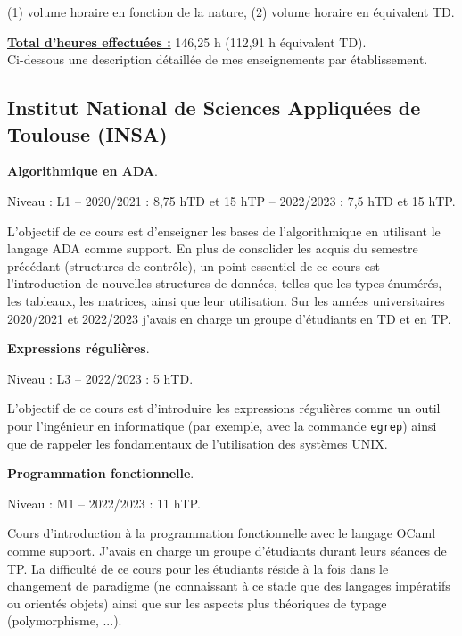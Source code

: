 (1) volume horaire en fonction de la nature, (2) volume horaire en équivalent TD.

\vspace{10pt}

\underline{\textbf{Total d'heures effectuées :}} 146,25 h (112,91 h équivalent TD).\\

Ci-dessous une description détaillée de mes enseignements par établissement.\\

\subsection*{Institut National de Sciences Appliquées de Toulouse (INSA)}

\vspace{10pt}
\textbf{Algorithmique en ADA}.\medbreak 

Niveau : L1 -- 2020/2021 : 8,75 hTD et 15 hTP -- 2022/2023 : 7,5 hTD et 15 hTP.
\begin{mdframed}
  L'objectif de ce cours est d'enseigner les bases de l'algorithmique en utilisant
  le langage ADA comme support. En plus de consolider les acquis du semestre
  précédant (structures de contrôle), un point essentiel de ce cours est
  l'introduction de nouvelles structures de données, telles que les types
  énumérés, les tableaux, les matrices, ainsi que leur utilisation. Sur les années
  universitaires 2020/2021 et 2022/2023 j'avais en charge un groupe d'étudiants en
  TD et en TP. 
\end{mdframed}

\vspace{10pt}
\textbf{Expressions régulières}.\medbreak 

Niveau : L3 -- 2022/2023 : 5 hTD.
\begin{mdframed}
  L'objectif de ce cours est d'introduire les expressions régulières comme un
  outil pour l'ingénieur en informatique (par exemple, avec la commande
  \texttt{egrep}) ainsi que de rappeler les fondamentaux de l'utilisation des
  systèmes UNIX.
\end{mdframed}
\newpage
\vspace{10pt}
\textbf{Programmation fonctionnelle}.\medbreak

Niveau : M1 -- 2022/2023 : 11 hTP.
\begin{mdframed}
  Cours d'introduction à la programmation fonctionnelle avec le langage OCaml
  comme support. J'avais en charge un groupe d'étudiants durant leurs séances de
  TP. La difficulté de ce cours pour les étudiants réside à la fois dans le changement de
  paradigme (ne connaissant à ce stade que des langages impératifs ou orientés
  objets) ainsi que sur les aspects plus théoriques de typage (polymorphisme,
  ...).  
\end{mdframed}

